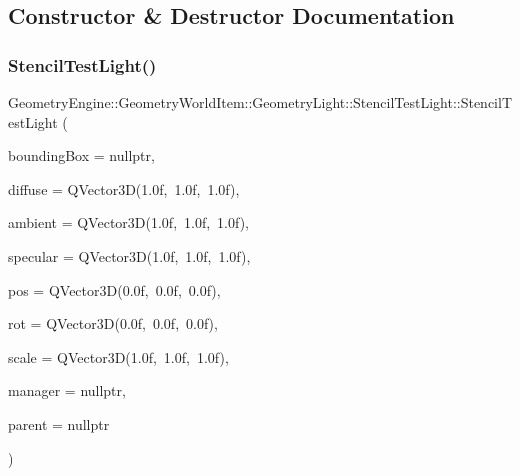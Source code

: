 \subsection{Constructor \& Destructor Documentation}
\mbox{\label{class_geometry_engine_1_1_geometry_world_item_1_1_geometry_light_1_1_stencil_test_light_a8bd4d1178930d5feb3984e127fec1f47}} 
\subsubsection{\texorpdfstring{StencilTestLight()}{StencilTestLight()}\hspace{0.1cm}{\footnotesize\ttfamily [1/2]}}
{\footnotesize\ttfamily Geometry\+Engine\+::\+Geometry\+World\+Item\+::\+Geometry\+Light\+::\+Stencil\+Test\+Light\+::\+Stencil\+Test\+Light (\begin{DoxyParamCaption}\item[{\mbox{\hyperlink{class_geometry_engine_1_1_geometry_world_item_1_1_geometry_item_1_1_geometry_item}{Geometry\+Item\+::\+Geometry\+Item}} $\ast$}]{bounding\+Box = {\ttfamily nullptr},  }\item[{const Q\+Vector3D \&}]{diffuse = {\ttfamily QVector3D(1.0f,~1.0f,~1.0f)},  }\item[{const Q\+Vector3D \&}]{ambient = {\ttfamily QVector3D(1.0f,~1.0f,~1.0f)},  }\item[{const Q\+Vector3D \&}]{specular = {\ttfamily QVector3D(1.0f,~1.0f,~1.0f)},  }\item[{const Q\+Vector3D \&}]{pos = {\ttfamily QVector3D(0.0f,~0.0f,~0.0f)},  }\item[{const Q\+Vector3D \&}]{rot = {\ttfamily QVector3D(0.0f,~0.0f,~0.0f)},  }\item[{const Q\+Vector3D \&}]{scale = {\ttfamily QVector3D(1.0f,~1.0f,~1.0f)},  }\item[{const \mbox{\hyperlink{class_geometry_engine_1_1_light_utils_1_1_light_component_manager}{Light\+Utils\+::\+Light\+Component\+Manager}} $\ast$const}]{manager = {\ttfamily nullptr},  }\item[{\mbox{\hyperlink{class_geometry_engine_1_1_geometry_world_item_1_1_world_item}{World\+Item}} $\ast$}]{parent = {\ttfamily nullptr} }\end{DoxyParamCaption})}

